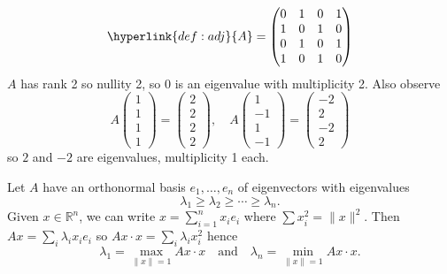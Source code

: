 \documentclass{article}
\begin{document}
\begin{eg}
\begin{enumerate}[label=\arabic*)]
            \begin{equation*}
                \hyperlink{def:adj}{A} =
                \begin{pmatrix}
                    0 & 1 & 0 & 1 \\
                    1 & 0 & 1 & 0 \\
                    0 & 1 & 0 & 1 \\
                    1 & 0 & 1 & 0
                \end{pmatrix}
            \end{equation*}
            $A$ has rank 2 so nullity 2, so 0 is an eigenvalue with multiplicity 2.
            Also observe
            \begin{equation*}
                A
                \begin{pmatrix}
                    1 \\ 1 \\ 1 \\ 1
                \end{pmatrix} =
                \begin{pmatrix}
                    2 \\2 \\ 2 \\ 2
                \end{pmatrix}, \quad
                A
                \begin{pmatrix}
                    1 \\ -1 \\ 1 \\ -1
                \end{pmatrix} =
                \begin{pmatrix}
                    -2 \\2 \\-2 \\ 2
                \end{pmatrix}
            \end{equation*}
            so $2$ and $-2$ are eigenvalues, multiplicity 1 each.
    \end{enumerate}
\end{eg}

Let $A$ have an orthonormal basis $e_1, \dotsc, e_n$ of eigenvectors with eigenvalues \begin{equation*}\lambda_1 \geq \lambda_2 \geq \dotsb \geq \lambda_n.\end{equation*}
Given $x \in \mathbb{R}^n$, we can write $x = \sum_{i=1}^n x_i e_i$ where $\sum x_i^2 = \|x\|^2$.
Then $Ax = \sum_i \lambda_i x_i e_i$ so $Ax \cdot x = \sum_i \lambda_i x_i^2$ hence
\begin{equation*}
    \lambda_1 = \max_{\|x\|=1} Ax \cdot x \quad \text{and} \quad \lambda_n = \min_{\|x\|=1} Ax \cdot x.
\end{equation*}
\end{document}
